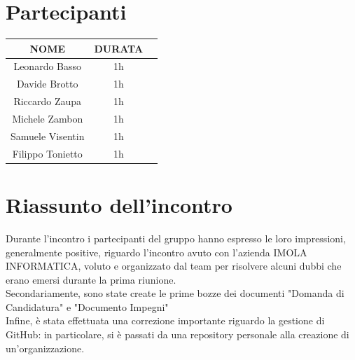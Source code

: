 \documentclass[12pt, oneside]{article}
\begin{document}
\section{Partecipanti}

\begin{center}
	\begin{tabular}{ | c | c | c | }
		\hline
		NOME & DURATA \\ 
		\hline
		Leonardo Basso & 1h \\  
		\hline 
		Davide Brotto & 1h \\   
        \hline
        Riccardo Zaupa & 1h \\   
		\hline
        Michele Zambon & 1h \\   
        \hline
        Samuele Visentin & 1h \\
        \hline
        Filippo Tonietto & 1h \\
        \hline
	\end{tabular}
\end{center}

\section{Riassunto dell'incontro}
Durante l'incontro i partecipanti del gruppo hanno espresso le loro impressioni, generalmente positive, riguardo l'incontro avuto con l'azienda IMOLA INFORMATICA, voluto e organizzato dal team per risolvere alcuni dubbi che erano emersi durante la prima riunione. \\
Secondariamente, sono state create le prime bozze dei documenti "Domanda di Candidatura" e "Documento Impegni" \\
Infine, è stata effettuata una correzione importante riguardo la gestione di GitHub: in particolare, si è passati da una repository personale alla creazione di un'organizzazione.
\end{document}

